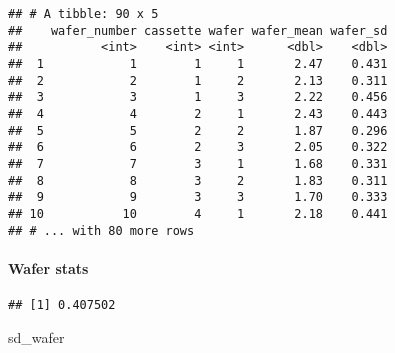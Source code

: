 \documentclass[]{book}
\newenvironment{Shaded}{\begin{snugshade}}{\end{snugshade}}
\newcommand{\DataTypeTok}[1]{\textcolor[rgb]{0.13,0.29,0.53}{#1}}
\newcommand{\DecValTok}[1]{\textcolor[rgb]{0.00,0.00,0.81}{#1}}
\newcommand{\KeywordTok}[1]{\textcolor[rgb]{0.13,0.29,0.53}{\textbf{#1}}}
\newcommand{\NormalTok}[1]{#1}
\newcommand{\OperatorTok}[1]{\textcolor[rgb]{0.81,0.36,0.00}{\textbf{#1}}}
\newcommand{\StringTok}[1]{\textcolor[rgb]{0.31,0.60,0.02}{#1}}
\let\oldparagraph\paragraph
\renewcommand{\paragraph}[1]{\oldparagraph{#1}\mbox{}}
\theoremstyle{definition}
\theoremstyle{definition}
\theoremstyle{definition}
\theoremstyle{remark}
\begin{document}
\begin{verbatim}
## # A tibble: 90 x 5
##    wafer_number cassette wafer wafer_mean wafer_sd
##           <int>    <int> <int>      <dbl>    <dbl>
##  1            1        1     1       2.47    0.431
##  2            2        1     2       2.13    0.311
##  3            3        1     3       2.22    0.456
##  4            4        2     1       2.43    0.443
##  5            5        2     2       1.87    0.296
##  6            6        2     3       2.05    0.322
##  7            7        3     1       1.68    0.331
##  8            8        3     2       1.83    0.311
##  9            9        3     3       1.70    0.333
## 10           10        4     1       2.18    0.441
## # ... with 80 more rows
\end{verbatim}

\hypertarget{wafer-stats}{%
\paragraph{Wafer stats}\label{wafer-stats}}

\begin{Shaded}
\end{Shaded}

\begin{verbatim}
## [1] 0.407502
\end{verbatim}

\begin{Shaded}
\begin{Highlighting}[]
\NormalTok{sd_wafer}
\end{Highlighting}
\end{Shaded}
\end{document}

